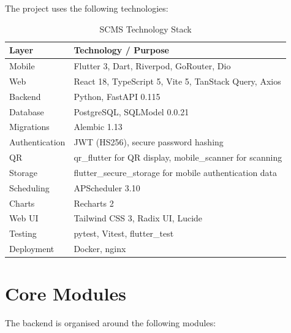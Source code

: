\documentclass[12pt,a4paper,oneside]{report}
\begin{document}
The project uses the following technologies:

\begin{table}[H]
\centering
\small
\begin{tabular}{p{3.3cm}p{9.2cm}}
\toprule
\textbf{Layer} & \textbf{Technology / Purpose}\\
\midrule
Mobile & Flutter 3, Dart, Riverpod, GoRouter, Dio\\
Web & React 18, TypeScript 5, Vite 5, TanStack Query, Axios\\
Backend & Python, FastAPI 0.115\\
Database & PostgreSQL, SQLModel 0.0.21\\
Migrations & Alembic 1.13\\
Authentication & JWT (HS256), secure password hashing\\
QR & qr\_flutter for QR display, mobile\_scanner for scanning\\
Storage & flutter\_secure\_storage for mobile authentication data\\
Scheduling & APScheduler 3.10\\
Charts & Recharts 2\\
Web UI & Tailwind CSS 3, Radix UI, Lucide\\
Testing & pytest, Vitest, flutter\_test\\
Deployment & Docker, nginx\\
\bottomrule
\end{tabular}
\caption{SCMS Technology Stack}
\label{tab:stack}
\end{table}

\section{Core Modules}

The backend is organised around the following modules:
\end{document}
